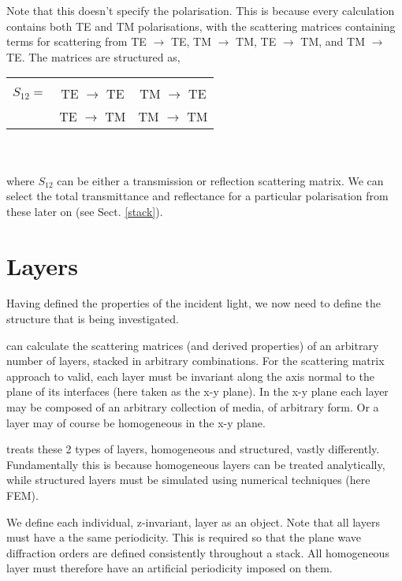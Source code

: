 \documentclass[11pt,a4paper,twoside]{report}
\begin{document}
Note that this doesn't specify the polarisation. This is because every calculation contains both TE and TM polarisations, with the scattering matrices containing terms for scattering from TE $\to$ TE, TM $\to$ TM, TE $\to$ TM, and TM $\to$ TE. The matrices are structured as,


\begin{tabular}{ r|c|c| }
\multicolumn{1}{r}{}
\\
\cline{2-3}
$S_{12} = $ & TE $\to$ TE & TM $\to$ TE \\
\cline{2-3}
            & TE $\to$ TM & TM $\to$ TM \\
\cline{2-3}
\end{tabular}
\\ \\ where $S_{12}$ can be either a transmission or reflection scattering matrix. We can select the total transmittance and reflectance for a particular polarisation from these later on (see Sect. \ref{stack}).





\section{Layers}

Having defined the properties of the incident light, we now need to define the structure that is being investigated.

\CodeName can calculate the scattering matrices (and derived properties) of an arbitrary number of layers, stacked in arbitrary combinations. For the scattering matrix approach to valid, each layer must be invariant along the axis normal to the plane of its interfaces (here taken as the x-y plane). In the x-y plane each layer may be composed of an arbitrary collection of media, of arbitrary form. Or a layer may of course be homogeneous in the x-y plane.

\CodeName treats these 2 types of layers, homogeneous and structured, vastly differently. Fundamentally this is because homogeneous layers can be treated analytically, while structured layers must be simulated using numerical techniques (here FEM).

We define each individual, z-invariant, layer as an object. 
Note that all layers must have a the same periodicity. This is required so that the plane wave diffraction orders are defined consistently throughout a stack. All homogeneous layer must therefore have an artificial periodicity imposed on them. 
\end{document}
